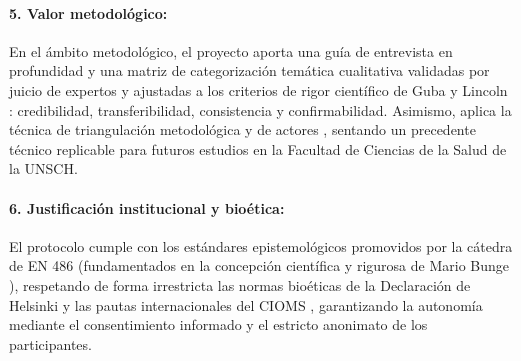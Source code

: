 \paragraph{5. Valor metodológico:}
En el ámbito metodológico, el proyecto aporta una guía de entrevista en profundidad y una matriz de categorización temática cualitativa validadas por juicio de expertos y ajustadas a los criterios de rigor científico de Guba y Lincoln \cite{gubalincoln1985}: credibilidad, transferibilidad, consistencia y confirmabilidad. Asimismo, aplica la técnica de triangulación metodológica y de actores \cite{okuda2005}, sentando un precedente técnico replicable para futuros estudios en la Facultad de Ciencias de la Salud de la UNSCH.

\paragraph{6. Justificación institucional y bioética:}
El protocolo cumple con los estándares epistemológicos promovidos por la cátedra de EN 486 (fundamentados en la concepción científica y rigurosa de Mario Bunge \cite{bunge2014}), respetando de forma irrestricta las normas bioéticas de la Declaración de Helsinki \cite{helsinki2013} y las pautas internacionales del CIOMS \cite{cioms2016}, garantizando la autonomía mediante el consentimiento informado y el estricto anonimato de los participantes.

\newpage
